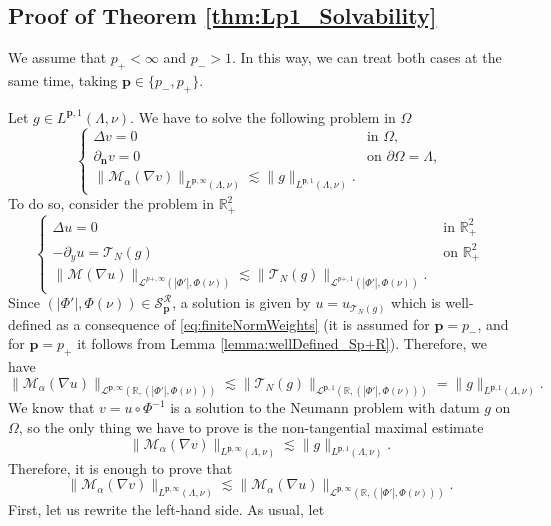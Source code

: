 \documentclass[12pt]{amsart}
\newcommand{\R}{\mathbb{R}}
\theoremstyle{plain}
\theoremstyle{definition}
\numberwithin{equation}{section}
\begin{document}
\subsection{Proof of Theorem \ref{thm:Lp1_Solvability}} We assume that $p_{+}<\infty$ and $p_{-}>1$. In this way, we can treat both cases at the same time, taking $\bm{p}\in \{p_{-},p_{+}\}$.

Let $g\in L^{\bm{p},1}(\Lambda, \nu)$. We have to solve the following problem in $\Omega$
\[
\begin{cases}
    \Delta v=0 & \text{in }\Omega,\\
    \partial_{\mathbf{n}}v=0 & \text{on }\partial \Omega=\Lambda,\\
    \|\mathcal{M}_{\alpha}(\nabla v)\|_{L^{\bm{p},\infty}(\Lambda, \nu)}
    \lesssim 
    \|g\|_{L^{\bm{p},1}(\Lambda, \nu)}.
\end{cases}
\]
To do so, consider the problem  in $\R_{+}^{2}$
\begin{equation}\label{eq:equivalentProblemEndpointCase}
    \begin{cases}
    \Delta u=0 & \text{ in }\R_{+}^{2}\\
    -\partial_y u=\mathcal{T}_{N}(g) & \text{ on }\R_{+}^{2}\\
    \|\mathcal{M}(\nabla u)\|_{\mathcal{L}^{p{+},\infty}(|\Phi'|,\Phi(\nu))}\lesssim \|\mathcal{T}_{N}(g)\|_{\mathcal{L}^{p{+},1}(|\Phi'|,\Phi(\nu))}.
    \end{cases}
\end{equation}
 Since $(|\Phi'|,\Phi(\nu))\in \mathcal{S}_{\bm{p}}^{\mathcal{R}}$, a solution is given by  $u=u_{\mathcal{T}_{N}(g)}$ which is well-defined as a consequence of \eqref{eq:finiteNormWeights} (it is assumed for $\bm{p}=p_{-}$, and for $\bm{p}=p_{+}$ it follows from Lemma \ref{lemma:wellDefined_Sp+R}). Therefore, we have
\[
\|\mathcal{M}_{\alpha}(\nabla u)\|_{\mathcal{L}^{\bm{p},\infty}(\R,(|\Phi'|,\Phi(\nu)))}
\lesssim 
\|\mathcal{T}_{N}(g)\|_{\mathcal{L}^{\bm{p},1}(\R,(|\Phi'|,\Phi(\nu)))}
=
\|g\|_{L^{\bm{p},1}(\Lambda,\nu)}.
\]
We know that $v=u\circ\Phi^{-1}$ is a solution to the Neumann problem with datum $g$ on $\Omega$, so the only thing we have to prove is the non-tangential maximal estimate
\[
\|\mathcal{M}_{\alpha}(\nabla v)\|_{L^{\bm{p},\infty}(\Lambda, \nu)}
\lesssim 
\|g\|_{L^{\bm{p},1}(\Lambda, \nu)}.
\]
Therefore, it is enough to prove that 
\[
\|\mathcal{M}_{\alpha}(\nabla v)\|_{L^{\bm{p},\infty}(\Lambda,\nu)}
\lesssim 
\|\mathcal{M}_{\alpha}(\nabla u)\|_{\mathcal{L}^{\bm{p},\infty}(\R,(|\Phi'|,\Phi(\nu)))}.
\]
First, let us rewrite the left-hand side. As usual, let 
\end{document}
